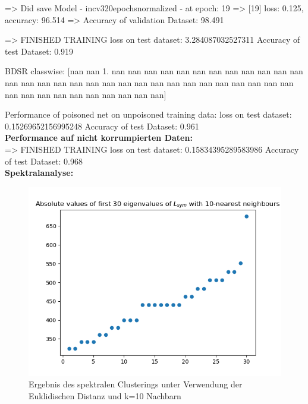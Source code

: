 \documentclass[twoside, 11pt,a4paper]{article}
\numberwithin{equation}{section}
\begin{document}
	
	=> Did save Model - incv320epochsnormalized - at epoch: 19
	=>	[19] loss: 0.125, accuracy: 96.514%
	=>	Accuracy of validation Dataset: 98.491%
	
	=>	FINISHED TRAINING
	loss on test dataset: 3.284087032527311
	Accuracy of test Dataset: 0.919 
	
	BDSR classwise:
	[nan nan  1. nan nan nan nan nan nan nan nan nan nan nan nan nan nan nan
	nan nan nan nan nan nan nan nan nan nan nan nan nan nan nan nan nan nan
	nan nan nan nan nan nan nan]
	
	Performance of poisoned net on unpoisoned training data:
	loss on test dataset: 0.15269652156995248
	Accuracy of test Dataset: 0.961 \\
	
	
	\noindent \textbf{Performance auf nicht korrumpierten Daten:}\\
	=>	FINISHED TRAINING
	loss on test dataset: 0.15834395289583986
	Accuracy of test Dataset: 0.968 \\
	
	
	
	\noindent \textbf{Spektralanalyse:}
	\begin{figure}[h]
		\begin{center}
			\includegraphics[width=0.5\textheight]{specClustering_l2_k10.png}
			\caption{Ergebnis des spektralen Clusterings unter Verwendung der Euklidischen Distanz und k=10 Nachbarn}
		\end{center}
	\end{figure}
	
\end{document}
